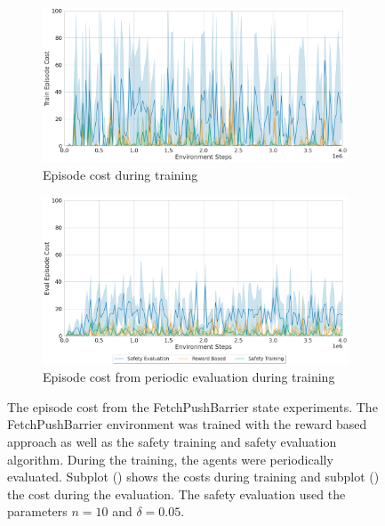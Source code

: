 \begin{figure}
    \centering
    \begin{subfigure}[b]{\textwidth}
        \centering
        \includegraphics[width=\textwidth]{images/results/push-barrier-state/cost.png}
        \caption{Episode cost during training}
        \label{fig:results:barrier-state-cost-train}
    \end{subfigure}
    \hfill
    \begin{subfigure}[b]{\textwidth}
        \centering
        \includegraphics[width=\textwidth]{images/results/push-barrier-state/eval_cost.png}
        \caption{Episode cost from periodic evaluation during training}
        \label{fig:results:barrier-state-cost-eval}
    \end{subfigure}
    \caption[The episode cost from the FetchPushBarrier state experiments.]{The episode cost from the FetchPushBarrier state experiments. The FetchPushBarrier environment was trained with the reward based approach as well as the safety training and safety evaluation algorithm. During the training, the agents were periodically evaluated. Subplot () shows the costs during training and subplot () the cost during the evaluation. The safety evaluation used the parameters $n=10$ and $\delta=0.05$.}
    \label{fig:results:barrier-state-cost}
\end{figure}

